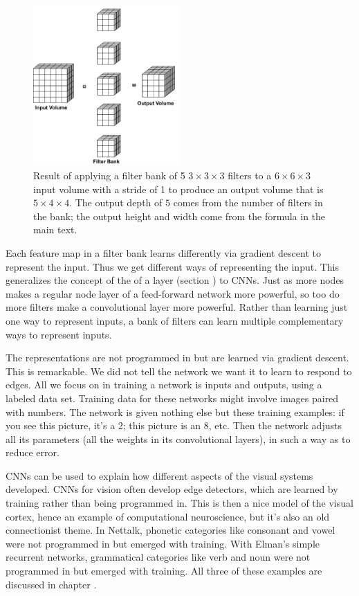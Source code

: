\begin{figure}
\centering
\includegraphics[width=0.5\textwidth]{images/filterBank}
\caption[Soraya Boza and Jeff Yoshimi.]{Result of applying a filter bank of 5 $3 \times 3 \times 3$ filters to a $6 \times 6 \times 3$ input volume with a stride of 1 to produce an output volume that is $5 \times 4 \times 4$. The output depth of $5$ comes from the number of filters in the bank; the output height and width come from the formula in the main text.}
\label{filterBank}
\end{figure}

Each feature map in a filter bank learns differently via gradient descent to represent the input. Thus we get different ways of representing the input. This generalizes the concept of the  of a layer (section ) to CNNs. Just as more nodes makes a regular node layer of a feed-forward network more powerful, so too do more filters make a convolutional layer more powerful. Rather than learning just one way to represent inputs, a bank of filters can learn multiple complementary ways to represent inputs.

The representations are not programmed in but are learned via gradient descent. This is remarkable. We did not tell the network we want it to learn to respond to edges. All we focus on in training a network is inputs and outputs, using a labeled data set. Training data for these networks might involve images paired with numbers. The network is given nothing else but these training examples: if you see this picture, it's a 2; this picture is an 8, etc. Then the network adjusts all its parameters (all the weights in its convolutional layers), in such a way as to reduce error. 

CNNs can be used to explain how different aspects of the visual systems developed. CNNs for vision often develop edge detectors, which are learned by training rather than being programmed in. This is then a nice model of the visual cortex, hence an example of computational neuroscience, but it's also an old connectionist theme. In Nettalk, phonetic categories like consonant and vowel were not programmed in but emerged with training. With Elman's simple recurrent networks, grammatical categories like verb and noun were not programmed in but emerged with training. All three of these examples are discussed in chapter .

